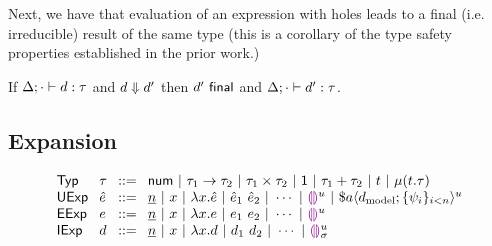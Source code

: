 Next, we have that evaluation of an expression with holes leads to a final (i.e. irreducible) result of the same type (this is a corollary
of the type safety properties established in the prior work.)
\begin{theorem}[Preservation]
    If $\Delta; \cdot \vdash d : \tau$ and $d \Downarrow d'$ then $d'~\mathsf{final}$ and $\Delta; \cdot \vdash d' : \tau$.
\end{theorem}

\subsection{Expansion}

\begin{figure}
    \[
    \arraycolsep=4pt\begin{array}{llcl}
        \mathsf{Typ} & \tau & ::= &
                                    \tnum ~\vert~
                                    \tarr{\tau_1}{\tau_2} ~\vert~
                                    \tprod{\tau_1}{\tau_2} ~\vert~
                                    \tunit ~\vert~
                                    \tsum{\tau_1}{\tau_2} ~\vert~
                                    t ~\vert~
                                    \trec{t}{\tau}\\
        \mathsf{UExp} & \hat{e} & ::= & \hnum{n} ~\vert~
                                 x ~\vert~
                                 \hlam{x}{\hat e} ~\vert~
                                 \hap{\hat e_1}{\hat e_2} ~\vert~
                                 \cdots ~\vert~
                                 \hehole{u} ~\vert~
                                 \haplivelit{u}{a}{\dtxt{model}}{\splices}\\
        \mathsf{EExp} & e & ::= & \hnum{n} ~\vert~ x ~\vert~ \hlam{x}{e} ~\vert~ \hap{e_1}{e_2} ~\vert~ \cdots ~\vert~ \hehole{u}\\
        \mathsf{IExp} & d & ::= & \hnum{n} ~\vert~ x ~\vert~ \hlam{x}{d} ~\vert~ \hap{d_1}{d_2} ~\vert~ \cdots ~\vert~ \dehole{u}{\sigma}\\

\end{array}\]
\end{figure}
